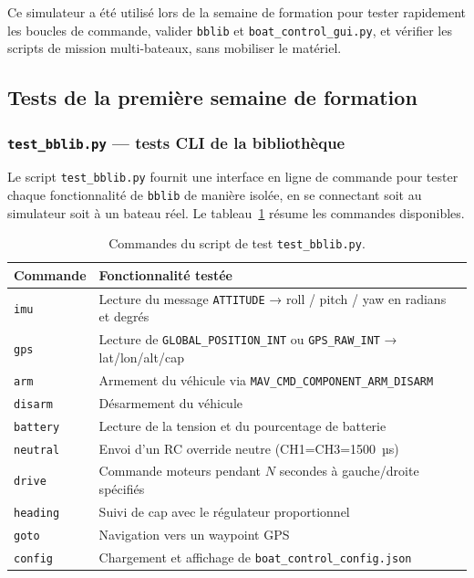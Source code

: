 Ce simulateur a été utilisé lors de la semaine de formation pour tester rapidement les boucles de commande, valider \texttt{bblib} et \texttt{boat\_control\_gui.py}, et vérifier les scripts de mission multi-bateaux, sans mobiliser le matériel.

\subsection{Tests de la première semaine de formation}
\label{sec:bblib:tests}

\subsubsection{\texttt{test\_bblib.py} — tests CLI de la bibliothèque}

Le script \texttt{test\_bblib.py} fournit une interface en ligne de commande pour tester chaque fonctionnalité de \texttt{bblib} de manière isolée, en se connectant soit au simulateur soit à un bateau réel. Le tableau~\ref{tab:test_bblib} résume les commandes disponibles.

\begin{table}[h]
  \centering
  \caption{Commandes du script de test \texttt{test\_bblib.py}.}
  \label{tab:test_bblib}
  \renewcommand{\arraystretch}{1.3}
  \begin{tabularx}{\textwidth}{l X}
    \toprule
    \textbf{Commande} & \textbf{Fonctionnalité testée} \\
    \midrule
    \texttt{imu}         & Lecture du message \texttt{ATTITUDE} → roll / pitch / yaw en radians et degrés \\
    \texttt{gps}         & Lecture de \texttt{GLOBAL\_POSITION\_INT} ou \texttt{GPS\_RAW\_INT} → lat/lon/alt/cap \\
    \texttt{arm}         & Armement du véhicule via \texttt{MAV\_CMD\_COMPONENT\_ARM\_DISARM} \\
    \texttt{disarm}      & Désarmement du véhicule \\
    \texttt{battery}     & Lecture de la tension et du pourcentage de batterie \\
    \texttt{neutral}     & Envoi d'un RC override neutre (CH1=CH3=1500~µs) \\
    \texttt{drive}       & Commande moteurs pendant $N$ secondes à gauche/droite spécifiés \\
    \texttt{heading}     & Suivi de cap avec le régulateur proportionnel \\
    \texttt{goto}        & Navigation vers un waypoint GPS \\
    \texttt{config}      & Chargement et affichage de \texttt{boat\_control\_config.json} \\
    \bottomrule
  \end{tabularx}
\end{table}

